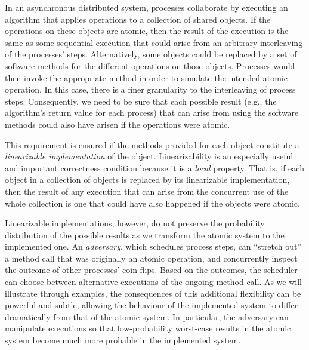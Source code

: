 \documentclass[11pt,letterpaper]{article}
\begin{document}
In an asynchronous distributed system, processes collaborate
by executing an algorithm that applies operations to a collection of shared objects.
If the operations on these objects are atomic, then the result of the execution
is the same as some sequential execution that could arise from an arbitrary interleaving
of the processes' steps.
Alternatively, some objects could be replaced by a set of software methods for the different operations on those objects.
Processes would then invoke the appropriate method in order to simulate the intended atomic operation.
In this case, there is a finer granularity to the interleaving of process steps.
Consequently, we need to be sure that each possible result (e.g., the algorithm's return value for each process) that can arise from using the software methods
could also have arisen if the operations were atomic.

This requirement is ensured if the methods provided for each object constitute
a \emph{linearizable implementation} \cite{her:lin} of the object.
Linearizability is an especially useful and important correctness condition because it is  a \emph{local} property.
That is, if each object in a collection of objects is replaced by its linearizable implementation,
then the result of any execution that can arise from the concurrent use of the whole collection is one
that could have also happened if the objects were atomic.

Linearizable implementations, however, do not preserve the probability distribution of the possible results
as we transform the atomic system to the implemented one.
An \emph{adversary}, which schedules process steps, can ``stretch out'' a method call that was originally an atomic operation,
and concurrently inspect the outcome of other processes' coin flips.
Based on the outcomes, the scheduler can choose between alternative executions of the ongoing method call.
As we will illustrate through examples,
the consequences of this additional flexibility can be powerful and subtle,
allowing the behaviour of the implemented system to differ dramatically from that
of the atomic system.
In particular, the adversary can manipulate executions so that low-probability worst-case results
in the atomic system become much more probable in the implemented system.
\end{document}
